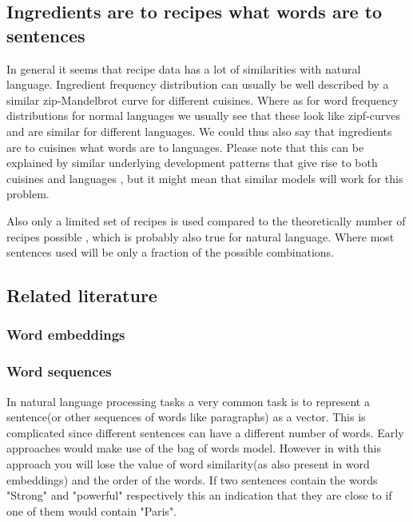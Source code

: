 \documentclass[a4paper]{scrartcl}
\begin{document}
\subsection{Ingredients are to recipes what words are to sentences}


In general it seems that recipe data has a lot of similarities with natural language. Ingredient frequency distribution can usually be well described by a similar zip-Mandelbrot curve \cite{kinouchi2008non} for different cuisines. Where as for word frequency distributions for normal languages we usually see that these look like zipf-curves and are similar for different languages. We could thus also say that ingredients are to cuisines what words are to languages. Please note that this can be explained by similar  underlying development patterns that give rise to both cuisines and languages \cite{ahn2011flavor,dahui2005true} , but it might mean that similar models will work for this problem.

Also only a limited set of recipes is used compared to the theoretically number of recipes possible , which is probably also true for natural language. Where most sentences used will be only a fraction of the possible combinations. 

\subsection{Related literature}
\subsubsection{Word embeddings}
\subsubsection{Word sequences}
In natural language processing tasks a very common task is to represent a sentence(or other sequences of words like paragraphs) as a vector. This is complicated since different sentences can have a different number of words. Early approaches would make use of the bag of words model. However in with this approach you will lose the value of word similarity(as also present in word embeddings) and the order of the words. If two sentences contain the words "Strong" and "powerful" respectively this an indication that they are close to if one of them would contain "Paris".
\end{document}
